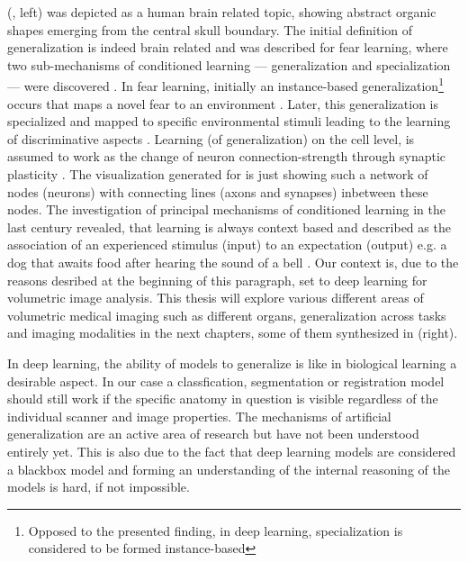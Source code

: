      (, left) was depicted as a human brain related topic, showing abstract organic shapes emerging from the central skull boundary.
    The initial definition of generalization is indeed brain related and was described for fear learning, where two sub-mechanisms of conditioned learning --- generalization and specialization --- were discovered \citep{xx, banich2011generalization}. %
    In fear learning, initially an instance-based generalization\footnote{Opposed to the presented finding, in deep learning, specialization is considered to be formed instance-based} occurs that maps a novel fear to an environment \citep{banich2011generalization}.
    Later, this generalization is specialized and mapped to specific environmental stimuli leading to the learning of discriminative aspects \citep{banich2011generalization}.
    Learning (of generalization) on the cell level, is assumed to work as the change of neuron connection-strength through synaptic plasticity \citep{do1949organization,martin2000synaptic}. The visualization generated for  is just showing such a network of nodes (neurons) with connecting lines (axons and synapses) inbetween these nodes.
    The investigation of principal mechanisms of conditioned learning in the last century revealed, that learning is always context based and described as the association of an experienced stimulus (input) to an expectation (output) e.g. a dog that awaits food after hearing the sound of a bell \citep{pavlov1928conditioned, pavlov2010conditioned, banich2011generalization}.
    Our context is, due to the reasons desribed at the beginning of this paragraph, set to deep learning for volumetric image analysis. This thesis will explore various different areas of volumetric medical imaging such as different organs, generalization across tasks and imaging modalities in the next chapters, some of them synthesized in  (right). %

    In deep learning, the ability of models to generalize is like in biological learning a desirable aspect. In our case a classfication, segmentation or registration model should still work if the specific anatomy in question is visible regardless of the individual scanner and image properties.
    The mechanisms of artificial generalization are an active area of research but have not been understood entirely yet. This is also due to the fact that deep learning models are considered a blackbox model and forming an understanding of the internal reasoning of the models is hard, if not impossible.

